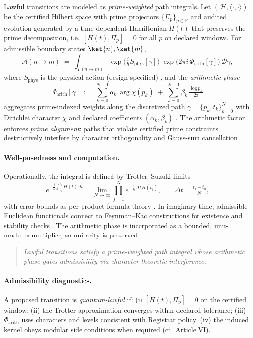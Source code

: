 \documentclass[12pt]{amsart}
\theoremstyle{plain}
\begin{document}
Lawful transitions are modeled as \emph{prime-weighted} path integrals. Let $(\mathcal{H},\langle\cdot,\cdot\rangle)$ be the certified Hilbert space with prime projectors $\{\Pi_p\}_{p\in\mathbb{P}}$ and audited evolution generated by a time-dependent Hamiltonian $H(t)$ that preserves the prime decomposition, i.e.\ $[H(t),\Pi_p]=0$ for all $p$ on declared windows. For admissible boundary states $\ket{n},\ket{m}$,
\[
\mathcal{A}(n\!\to\! m)\;=\;\int_{\Gamma(n\to m)} \exp\!\Big(\tfrac{i}{\hbar}S_{\mathrm{phys}}[\gamma]\Big)\;
\exp\!\big(2\pi i\,\Phi_{\mathrm{arith}}[\gamma]\big)\, \mathcal{D}\gamma,
\]
where $S_{\mathrm{phys}}$ is the physical action (design-specified) \cite{feynman1965path,schulman1981techniques}, and the \emph{arithmetic phase}
\[
\Phi_{\mathrm{arith}}[\gamma]\;:=\;\sum_{k=0}^{N-1}\alpha_k\,\arg \chi(p_k)\;+\;\sum_{k=0}^{N-1}\beta_k\,\tfrac{\log p_k}{2\pi}
\]
aggregates prime-indexed weights along the discretized path $\gamma=\{p_k,t_k\}_{k=0}^{N}$ with Dirichlet character $\chi$ and declared coefficients $(\alpha_k,\beta_k)$ \cite{davenport2000multiplicative,iwaniec2004analytic}. The arithmetic factor enforces \emph{prime alignment}: paths that violate certified prime constraints destructively interfere by character orthogonality and Gauss-sum cancellation \cite{davenport2000multiplicative}.

\paragraph{Well-posedness and computation.}
Operationally, the integral is defined by Trotter–Suzuki limits
\[
e^{-\tfrac{i}{\hbar}\int_{t_0}^{t_1}\!H(t)\,dt}
=\lim_{N\to\infty}\prod_{j=1}^{N}e^{-\tfrac{i}{\hbar}\Delta t\,H(t_j)}\!,
\qquad \Delta t=\tfrac{t_1-t_0}{N},
\]
with error bounds as per product-formula theory \cite{trotter1959product,suzuki1976generalized}. In imaginary time, admissible Euclidean functionals connect to Feynman–Kac constructions for existence and stability checks \cite{simon2005functional}. The arithmetic phase is incorporated as a bounded, unit-modulus multiplier, so unitarity is preserved.

\begin{quote}
\textit{Lawful transitions satisfy a prime-weighted path integral whose arithmetic phase gates admissibility via character-theoretic interference.}
\end{quote}

\paragraph{Admissibility diagnostics.}
A proposed transition is \emph{quantum-lawful} if: (i) $[H(t),\Pi_p]=0$ on the certified window; (ii) the Trotter approximation converges within declared tolerance; (iii) $\Phi_{\mathrm{arith}}$ uses characters and levels consistent with Registrar policy; (iv) the induced kernel obeys modular side conditions when required (cf.\ Article VI).
\end{document}
